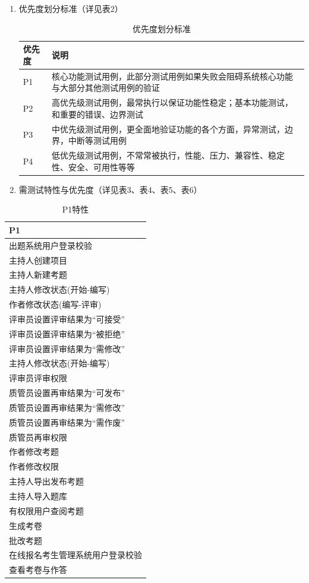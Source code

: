 \documentclass[hyperref, a4paper]{ctexart}
\providecommand{\tightlist}{%
  \setlength{\itemsep}{0pt}\setlength{\parskip}{0pt}}
\begin{document}
\begin{enumerate}
\def\labelenumi{\arabic{enumi}.}
\tightlist
\item
  优先度划分标准（详见表2）

  \begin{table}[h]
  \centering
  \caption{优先度划分标准}
  \begin{tabular}{|p{2cm}|p{8cm}|}
  \hline
  优先度 & 说明\\
  \hline
  P1 & 核心功能测试用例，此部分测试用例如果失败会阻碍系统核心功能与大部分其他测试用例的验证\\
  \hline
  P2 & 高优先级测试用例，最常执行以保证功能性稳定；基本功能测试，和重要的错误、边界测试\\
  \hline
  P3 & 中优先级测试用例，更全面地验证功能的各个方面，异常测试，边界，中断等测试用例\\
  \hline
  P4 & 低优先级测试用例，不常常被执行，性能、压力、兼容性、稳定性、安全、可用性等等\\
  \hline
  \end{tabular}
  \end{table}
\item
  需测试特性与优先度（详见表3、表4、表5、表6）
\end{enumerate}

\begin{table}
\centering
\caption{P1特性}
\begin{tabular}{|p{10cm}|}
\hline
P1\\
\hline
出题系统用户登录校验\\
\hline
主持人创建项目\\
\hline
主持人新建考题\\
\hline
主持人修改状态(开始-编写)\\
\hline
作者修改状态(编写-评审) \\
\hline
评审员设置评审结果为“可接受” \\
\hline
评审员设置评审结果为“被拒绝”\\
\hline
评审员设置评审结果为“需修改” \\
\hline
主持人修改状态(开始-编写)\\
\hline
评审员评审权限\\
\hline
质管员设置再审结果为“可发布” \\
\hline
质管员设置再审结果为“需修改” \\
\hline
质管员设置再审结果为“需作废”\\
\hline
质管员再审权限\\
\hline
作者修改考题\\
\hline
作者修改权限\\
\hline
主持人导出发布考题\\
\hline
主持人导入题库\\
\hline
有权限用户查阅考题\\
\hline
生成考卷\\
\hline
批改考题\\
\hline
在线报名考生管理系统用户登录校验\\
\hline
查看考卷与作答\\
\hline
\end{tabular}
\end{table}
\end{document}
